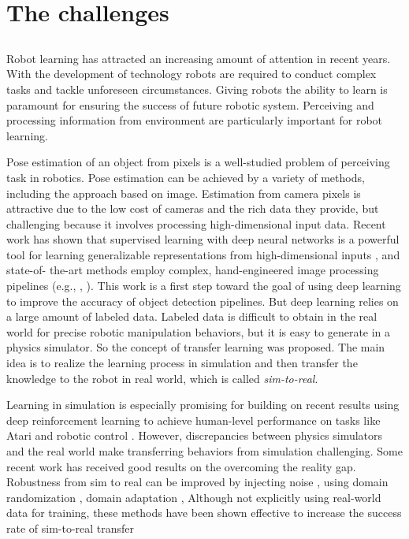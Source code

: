 \part{The challenges}
\chapter{}
\label{sec:Introduction}
Robot learning has attracted an increasing amount of attention in recent years.  With the development of technology robots are required to conduct complex tasks and tackle unforeseen circumstances. Giving robots the ability to learn is paramount for ensuring the success of future robotic system. Perceiving and processing information from environment are particularly important for robot learning.

Pose estimation of an object from pixels is a well-studied problem of perceiving task in robotics. Pose estimation can be achieved by a variety of methods, including the approach based on image. Estimation from camera pixels is attractive due to the low cost of cameras and the rich data they provide, but challenging because it involves processing high-dimensional input data. Recent work has shown that supervised learning with deep neural networks is a powerful tool for learning generalizable representations from high-dimensional inputs \cite{lecun2015yoshua}, and state-of- the-art methods employ complex, hand-engineered image processing pipelines (e.g., \cite{collet2011moped}, \cite{tang2012textured}). This work is a first step toward the goal of using deep learning to improve the accuracy of object detection pipelines. But deep learning relies on a large amount of labeled data. Labeled data is difficult to obtain in the real world for precise robotic manipulation behaviors, but it is easy to generate in a physics simulator. So the concept of transfer learning was proposed. The main idea is to realize the learning process in simulation and then transfer the knowledge to the robot in real world, which is called \textit{sim-to-real}.

Learning in simulation is especially promising for building on recent results using deep reinforcement learning to achieve human-level performance on tasks like Atari \cite{mnih2015human} and robotic control \cite{levine2016end}. However, discrepancies between physics simulators and the real world make transferring behaviors from simulation challenging. Some recent work has received good results on the overcoming the reality gap. Robustness from sim to real can be improved by injecting noise \cite{su2015render}, using domain randomization \cite{tobin2017domain}, domain adaptation \cite{sun2014virtual}, Although not explicitly using real-world data for training, these methods have been shown effective to increase the success rate of sim-to-real transfer

